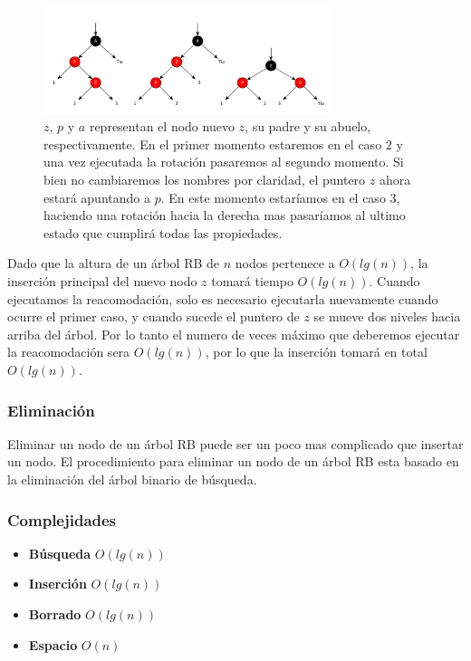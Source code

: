 \begin{figure}
 \centering
 \includegraphics[width=0.75\textwidth]{graficos/RBCaso3.pdf}
 \caption*{\newline \footnotesize $z$, $p$ y $a$ representan el nodo nuevo $z$, su padre y su abuelo, respectivamente. En el primer momento estaremos en el caso $2$ y una vez ejecutada la rotaci\'on pasaremos al segundo momento. Si bien no cambiaremos los nombres por claridad, el puntero $z$ ahora estar\'a apuntando a $p$. En este momento estar\'iamos en el caso $3$, haciendo una rotaci\'on hacia la derecha mas pasar\'iamos al ultimo estado que cumplir\'a todas las propiedades.}
\end{figure}
 
Dado que la altura de un \'arbol RB de $n$ nodos pertenece a $O(lg(n))$, la inserci\'on principal del nuevo nodo $z$ tomar\'a tiempo $O(lg(n))$. Cuando ejecutamos la reacomodaci\'on, solo es necesario ejecutarla nuevamente cuando ocurre el primer caso, y cuando sucede el puntero de $z$ se mueve dos niveles hacia arriba del \'arbol. Por lo tanto el numero de veces m\'aximo que deberemos ejecutar la reacomodaci\'on sera $O(lg(n))$, por lo que la inserci\'on tomar\'a en total $O(lg(n))$.

\subsubsection{Eliminaci\'on}

Eliminar un nodo de un \'arbol RB puede ser un poco mas complicado que insertar un nodo. El procedimiento para eliminar un nodo de un \'arbol RB esta basado en la eliminaci\'on del \'arbol binario de b\'usqueda.


\subsubsection{Complejidades}

\begin{itemize}
 \item \textbf{B\'usqueda} $O(lg(n))$
 \item \textbf{Inserci\'on} $O(lg(n))$
 \item \textbf{Borrado} $O(lg(n))$
 \item \textbf{Espacio} $O(n)$
\end{itemize}

